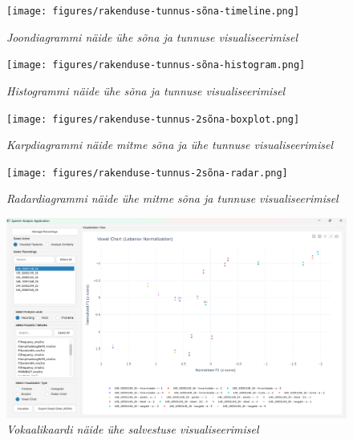 \begin{figure}[ht]
    \centering
    \texttt{[image: figures/rakenduse-tunnus-sõna-timeline.png]}
    \caption{\textit{Joondiagrammi näide ühe sõna ja tunnuse visualiseerimisel}}
    \label{fig:rakenduse-tunnus-sõna-timeline}
\end{figure}
\begin{figure}[ht]
    \centering
    \texttt{[image: figures/rakenduse-tunnus-sõna-histogram.png]}
    \caption{\textit{Histogrammi näide ühe sõna ja tunnuse visualiseerimisel}}
    \label{fig:rakenduse-tunnus-sõna-histogram}
\end{figure}
\begin{figure}[ht]
    \centering
    \texttt{[image: figures/rakenduse-tunnus-2sõna-boxplot.png]}
    \caption{\textit{Karpdiagrammi näide mitme sõna ja ühe tunnuse visualiseerimisel}}
    \label{fig:rakenduse-tunnus-sõna-boxplot}
\end{figure}
\begin{figure}[ht]
    \centering
    \texttt{[image: figures/rakenduse-tunnus-2sõna-radar.png]}
    \caption{\textit{Radardiagrammi näide ühe mitme sõna ja tunnuse visualiseerimisel}}
    \label{fig:rakenduse-tunnus-2sõna-radar}
\end{figure}
\begin{figure}[ht]
    \centering
    \includegraphics[width=\textwidth]{figures/rakenduse-tunnus-salvestus-vowel}
    \caption{\textit{Vokaalikaardi näide ühe salvestuse visualiseerimisel}}
    \label{fig:rakenduse-tunnus-salvestus-vowel}
\end{figure}

